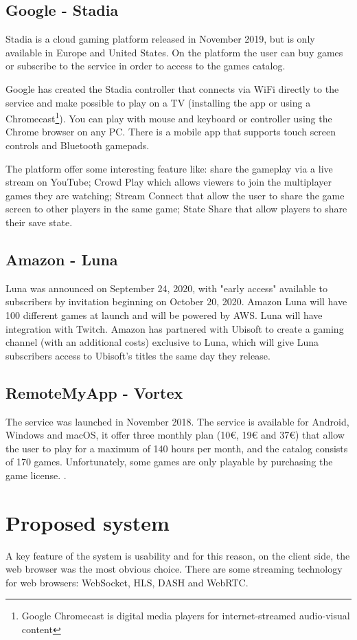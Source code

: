 \subsection{Google - Stadia}
Stadia is a cloud gaming platform released in November 2019, but is only available in Europe and United States. On the platform the user can buy games or subscribe to the service in order to access to the games catalog.

Google has created the Stadia controller that connects via WiFi directly to the service and make possible to play on a TV (installing the app or using a Chromecast\footnote{Google Chromecast is digital media players for internet-streamed audio-visual content}). You can play with mouse and keyboard or controller using the Chrome browser on any PC. There is a mobile app that supports touch screen controls and Bluetooth gamepads.

The platform offer some interesting feature like: share the gameplay via a live stream on YouTube; Crowd Play which allows viewers to join the multiplayer games they are watching; Stream Connect that allow the user to share the game screen to other players in the same game; State Share that allow players to share their save state\cite{Google_Stadia}.

\subsection{Amazon - Luna}
Luna was announced on September 24, 2020, with "early access" available to subscribers by invitation beginning on October 20, 2020. Amazon Luna will have 100 different games at launch and will be powered by AWS. Luna will have integration with Twitch. Amazon has partnered with Ubisoft to create a gaming channel (with an additional costs) exclusive to Luna, which will give Luna subscribers access to Ubisoft's titles the same day they release\cite{Amazon_Luna}.

\subsection{RemoteMyApp - Vortex}
The service was launched in November 2018. The service is available for Android, Windows and macOS, it offer three monthly plan (10€, 19€ and 37€) that allow the user to play for a maximum of 140 hours per month, and the catalog consists of 170 games. Unfortunately, some games are only playable by purchasing the game license.
\cite{RemoteMyApp_Vortex}.


\section{Proposed system}
A key feature of the system is usability and for this reason, on the client side, the web browser was the most obvious choice.
There are some streaming technology for web browsers: WebSocket, HLS, DASH and WebRTC\cite{Audio_and_video_delivery}.

